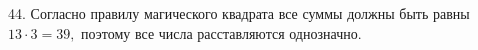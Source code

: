 44. Согласно правилу магического квадрата все суммы должны быть равны $13\cdot3=39,$ поэтому все числа расставляются однозначно.
\begin{center}
\begin{figure}[ht!]
\end{figure}
\end{center}
